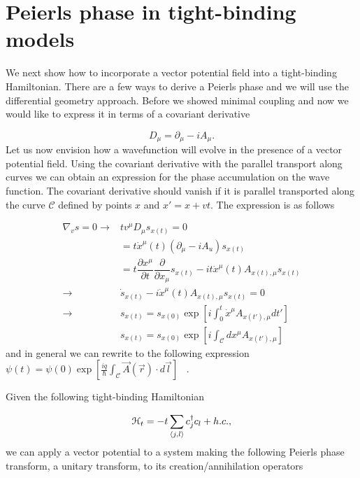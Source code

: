 \section{Peierls phase in tight-binding models}
We next show how to incorporate a vector potential field into a tight-binding Hamiltonian.
There are a few ways to derive a Peierls phase and we will use the differential geometry approach.
Before we showed minimal coupling and now we would like to express it in terms of a covariant derivative

\begin{equation}
  D_{\mu} = \partial_{\mu} - i A_{\mu}.
\end{equation}
Let us now envision how a wavefunction will evolve in the presence of a vector potential field.
Using the covariant derivative with the parallel transport along curves we can obtain an expression for the phase accumulation on the wave function.
The covariant derivative should vanish if it is parallel transported along the curve $\mathcal{C}$ defined by points $x$ and $x' = x + v t$.
The expression is as follows

\begin{align}
  \nabla_{v} s = 0 \rightarrow & t v^{\mu} D_{\mu} s_{x(t)} = 0 \\
  &= t \dot{x}^{\mu}(t) (\partial_{\mu} - i A_u) s_{x(t)} \nonumber \\
  &= t \dfrac{\partial {x}^{\mu}}{\partial t} \dfrac{\partial}{\partial x_{\mu}} s_{x(t)} - it\dot{x}^{\mu}(t) A_{x(t),\mu} s_{x(t)} \nonumber \\
  \rightarrow & \dot{s}_{x(t)} - i \dot{x}^{\mu}(t) A_{x(t),\mu} s_{x(t)} = 0 \nonumber \\
  \rightarrow & s_{x(t)} = s_{x(0)} \exp \left[ i\int^t_0 \dot{x}^{\mu} A_{x(t'),\mu} dt' \right] \nonumber \\
  & s_{x(t)} = s_{x(0)} \exp \left[ i\int_{\mathcal{C}} dx^{\mu} A_{x(t'),\mu} \right] \nonumber
\end{align}
and in general we can rewrite to the following expression $\psi(t) = \psi(0) \exp \left[ \tfrac{iq}{\hbar} \int_{\mathcal{C}} \vec{A}(\vec{r})\cdot d\vec{l} \right]$  ~\cite{altlandCondensedMatterField2023}.

Given the following tight-binding Hamiltonian

\begin{equation}
  \mathcal{H}_t = -t \sum_{\langle j, l \rangle} c^{\dagger}_j c_{l} + h.c.,
\end{equation}
we can apply a vector potential to a system making the following Peierls phase transform, a unitary transform, to its creation/annihilation operators

